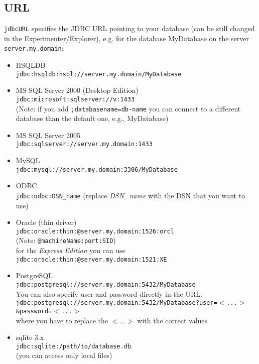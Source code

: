 \subsection*{URL}
\texttt{jdbcURL} specifies the JDBC URL pointing to your database (can be still changed in the Experimenter/Explorer), e.g. for the database MyDatabase on the server \texttt{server.my.domain}:

\begin{itemize}
	\item HSQLDB \\
	\texttt{jdbc:hsqldb:hsql://server.my.domain/MyDatabase}
	\item MS SQL Server 2000 (Desktop Edition) \\
	\texttt{jdbc:microsoft:sqlserver://v:1433} \\
	(Note: if you add \texttt{;databasename=db-name} you can connect to a different database than the default one, e.g., MyDatabase)
	\item MS SQL Server 2005 \\
	\texttt{jdbc:sqlserver://server.my.domain:1433}
	\item MySQL \\
	\texttt{jdbc:mysql://server.my.domain:3306/MyDatabase}
	\item ODBC \\
	\texttt{jdbc:odbc:DSN\_name} (replace \textit{DSN\_name} with the DSN that you want to use)
	\item Oracle (thin driver) \\
	\texttt{jdbc:oracle:thin:@server.my.domain:1526:orcl} \\
	(Note: \texttt{@machineName:port:SID}) \\
	for the \textit{Express Edition} you can use \\
	\texttt{jdbc:oracle:thin:@server.my.domain:1521:XE}
	\item PostgreSQL \\
	\texttt{jdbc:postgresql://server.my.domain:5432/MyDatabase} \\
	You can also specify user and password directly in the URL: \\
	\texttt{jdbc:postgresql://server.my.domain:5432/MyDatabase?user=$<$...$>$\&password=$<$...$>$} \\
	where you have to replace the $<$...$>$ with the correct values
	\item sqlite 3.x \\
	\texttt{jdbc:sqlite:/path/to/database.db} \\
	(you can access only local files)
\end{itemize}

